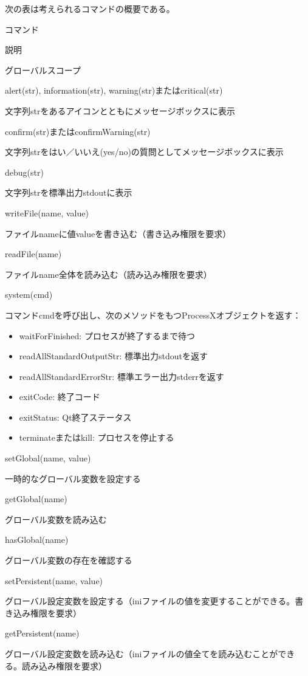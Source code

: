 \documentclass[]{book}
\begin{document}
次の表は考えられるコマンドの概要である。

コマンド

説明

グローバルスコープ

alert(str), information(str), warning(str)またはcritical(str)

文字列strをあるアイコンとともにメッセージボックスに表示

confirm(str)またはconfirmWarning(str)

文字列strをはい／いいえ(yes/no)の質問としてメッセージボックスに表示

debug(str)

文字列strを標準出力stdoutに表示

writeFile(name, value)

ファイルnameに値valueを書き込む（書き込み権限を要求）

readFile(name)

ファイルname全体を読み込む（読み込み権限を要求）

system(cmd)

コマンドcmdを呼び出し、次のメソッドをもつProcessXオブジェクトを返す：

\begin{itemize}
\item
  waitForFinished: プロセスが終了するまで待つ
\item
  readAllStandardOutputStr: 標準出力stdoutを返す
\item
  readAllStandardErrorStr: 標準エラー出力stderrを返す
\item
  exitCode: 終了コード
\item
  exitStatus: Qt終了ステータス
\item
  terminateまたはkill: プロセスを停止する
\end{itemize}

setGlobal(name, value)

一時的なグローバル変数を設定する

getGlobal(name)

グローバル変数を読み込む

hasGlobal(name)

グローバル変数の存在を確認する

setPersistent(name, value)

グローバル設定変数を設定する（iniファイルの値を変更することができる。書き込み権限を要求）

getPersistent(name)

グローバル設定変数を読み込む（iniファイルの値全てを読み込むことができる。読み込み権限を要求）
\end{document}
